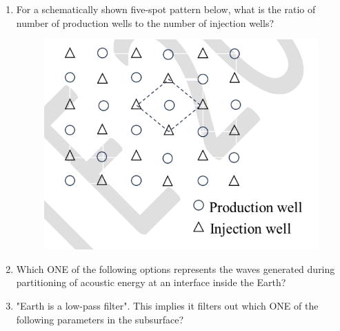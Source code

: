 \documentclass[journal,12pt,onecolumn]{IEEEtran}
\theoremstyle{remark}
\begin{document}
\begin{enumerate}
\item  For a schematically shown five-spot pattern below, what is the ratio of number of production wells to the number of injection wells?
\begin{figure}[h]
    \centering
    \includegraphics[width=0.5\columnwidth]{figs/im 6.jpeg}
    \caption{}
    \label{fig:placeholder}
\end{figure}


\begin{enumerate}
\end{enumerate}
\hfill{}



\item  Which ONE of the following options represents the waves generated during partitioning of acoustic energy at an interface inside the Earth?
\begin{enumerate}
\end{enumerate}
\hfill{}



\item  "Earth is a low-pass filter". This implies it filters out which ONE of the following parameters in the subsurface?
\begin{enumerate}
\end{enumerate}
\hfill{}




\end{enumerate}
\end{document}
